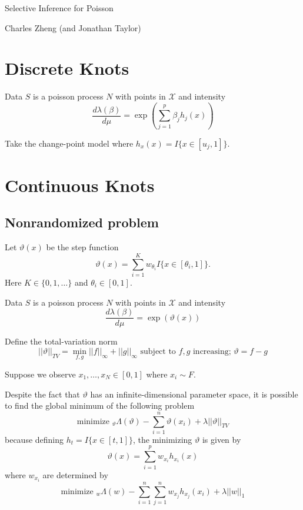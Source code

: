 \documentclass[11pt]{article}
\begin{document}
\newcommand{\tr}{\text{tr}}
\newcommand{\E}{\textbf{E}}
\newcommand{\diag}{\text{diag}}
\newcommand{\argmax}{\text{argmax}}
\newcommand{\Cov}{\text{Cov}}
\newcommand{\Var}{\text{Var}}
\renewcommand{\thefootnote}{\fnsymbol{footnote}}

\begin{center}
\noindent Selective Inference for Poisson

Charles Zheng (and Jonathan Taylor)
\end{center}

\section{Discrete Knots}

Data $S$ is a poisson process $N$ with points in $\mathcal{X}$ and intensity
\[
\frac{d\lambda(\beta)}{d\mu} = \exp\left(\sum_{j=1}^p \beta_j h_j(x)\right)
\]

Take the change-point model where $h_x(x) = I\{x \in [u_j, 1]\}$.

\section{Continuous Knots}

\subsection{Nonrandomized problem}

Let $\vartheta(x)$ be the step function
\[
\vartheta(x) = \sum_{i=1}^K w_{\theta_i} I\{x \in [\theta_i, 1]\}.
\]
Here $K \in \{0, 1, \hdots\}$ and $\theta_i \in [0,1]$.

Data $S$ is a poisson process $N$ with points in $\mathcal{X}$ and intensity
\[
\frac{d\lambda(\beta)}{d\mu} = \exp(\vartheta(x))
\]

Define the total-variation norm
\[
||\vartheta||_{TV} = \min_{f, g} ||f||_\infty + ||g||_\infty \text{ subject to $f, g$ increasing; $\vartheta = f - g$}
\]

Suppose we observe $x_1,\hdots, x_N \in [0,1]$ where $x_i \sim F$.

Despite the fact that $\vartheta$ has an infinite-dimensional
parameter space, it is possible to find the global minimum of the
following problem
\[
\text{minimize }_\vartheta \Lambda(\vartheta) - \sum_{i=1}^n \vartheta(x_i) + \lambda ||\vartheta||_{TV}
\]
because defining $h_t = I\{x \in [t, 1]\}$, the minimizing $\vartheta$ is given by
\[
\vartheta(x) = \sum_{i=1}^p w_{x_i} h_{x_i}(x)
\]
where $w_{x_i}$ are determined by
\[
\text{minimize }_w \Lambda(w) - \sum_{i=1}^n \sum_{j=1}^n w_{x_j}h_{x_j}(x_i) + \lambda ||w||_1 
\]
\end{document}
